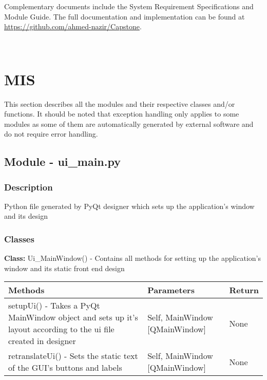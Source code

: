 \documentclass[12pt, titlepage]{article}
\begin{document}
Complementary documents include the System Requirement Specifications
and Module Guide.  The full documentation and implementation can be
found at \url{https://github.com/ahmed-nazir/Capstone}.  


~\newpage

\section{MIS } \label{Module} 
This section describes all the modules and their respective classes and/or functions. It should be noted that exception handling only applies to some
modules as some of them are automatically generated by external software and do not require error handling.


  \subsection{Module - ui\_main.py}

  \subsubsection{Description}
  Python file generated by PyQt designer which sets up the application’s window and its design

  \subsubsection{Classes}
  \textbf{Class:} Ui\_MainWindow() - Contains all methods for setting up the application’s window and its static front end design \\

    \noindent \begin{tabular}{| p{} | p{}| p{}|}
      \hline
      \rowcolor[gray]{0.9}
      Methods & Parameters & Return\\
      \hline
      setupUi() - Takes a PyQt MainWindow object and sets up it’s layout according to the ui file created in designer &Self, MainWindow [QMainWindow] & None \\
      \hline
      retranslateUi() - Sets the static text of the GUI’s buttons and labels & Self, MainWindow [QMainWindow] & None \\
      \hline
    \end{tabular}
\end{document}

